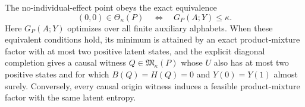 The no-individual-effect point obeys the exact equivalence
\[
(0,0)\in\Theta_\kappa(P)\quad\Longleftrightarrow\quad G_P(A;Y)\leq\kappa.
\]
Here \(G_P(A;Y)\) optimizes over all finite auxiliary alphabets. When these equivalent conditions hold, its minimum is attained by an exact product-mixture factor with at most two positive latent states, and the explicit diagonal completion gives a causal witness \(Q\in\mathfrak M_\kappa(P)\) whose \(U\) also has at most two positive states and for which \(B(Q)=H(Q)=0\) and \(Y(0)=Y(1)\) almost surely. Conversely, every causal origin witness induces a feasible product-mixture factor with the same latent entropy.
